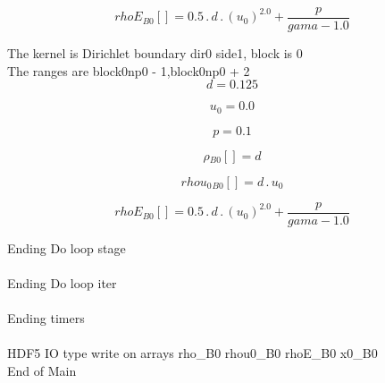 \documentclass{article}
\begin{document}
\begin{dmath}{rhoE{_{B0}}}[{}] = 0.5 \,.\, d \,.\, \left(u_{0} \right)^{2.0} + \frac{p}{gama - 1.0}\end{dmath}

\noindent The kernel is Dirichlet boundary dir0 side1, block is 0\\\noindent The ranges are block0np0 - 1,block0np0 + 2\\\begin{dmath}d = 0.125\end{dmath}

\begin{dmath}u_{0} = 0.0\end{dmath}

\begin{dmath}p = 0.1\end{dmath}

\begin{dmath}{\rho{_{B0}}}[{}] = d\end{dmath}

\begin{dmath}{rhou_{0}{_{B0}}}[{}] = d \,.\, u_{0}\end{dmath}

\begin{dmath}{rhoE{_{B0}}}[{}] = 0.5 \,.\, d \,.\, \left(u_{0} \right)^{2.0} + \frac{p}{gama - 1.0}\end{dmath}

\noindent Ending Do loop stage\\
\\\noindent Ending Do loop iter\\
\\\noindent Ending timers\\
\\\noindent HDF5 IO type write on arrays rho_B0 rhou0_B0 rhoE_B0 x0_B0\\\noindent End of Main\\
\end{document}
